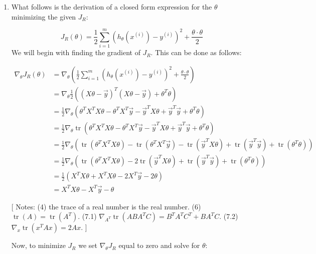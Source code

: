 \documentclass[12pt]{article}
\DeclareMathOperator{\Tr}{tr}
\begin{document}
\begin{enumerate}
   \item What follows is the derivation of a closed form expression for the  $\theta$ minimizing the given $J_R$:
   
   \[
   J_R(\theta) = \frac{1}{2} \sum_{i=1}^{m} \left( h_\theta (x^{(i)}) - y^{(i)} \right)^2 + \frac{\theta \cdot \theta}{2} 
   \]
   We will begin with finding the gradient of $J_R$. This can be done as follows:
   
   \begin{align}
   \nabla_\theta J_R(\theta) &= \nabla_\theta \left( \frac{1}{2} \sum_{i=1}^{m} \left( h_\theta (x^{(i)}) - y^{(i)} \right)^2 + \frac{\theta \cdot \theta}{2} \right)   \\
   &= \nabla_\theta \frac{1}{2} \left((X\theta - \vec{y})^T(X\theta - \vec{y}) + \theta^T \theta \right) \\
   &= \frac{1}{2} \nabla_\theta \left( \theta^TX^TX\theta - \theta^TX^T\vec{y} - \vec{y}^TX\theta + \vec{y}^T\vec{y} + \theta^T\theta \right) \\
   &= \frac{1}{2} \nabla_\theta \Tr \left( \theta^TX^TX\theta - \theta^TX^T\vec{y} - \vec{y}^TX\theta + \vec{y}^T\vec{y} + \theta^T\theta \right) \\
   &= \frac{1}{2} \nabla_\theta \left( \Tr(\theta^TX^TX\theta) - \Tr( \theta^TX^T\vec{y}) - \Tr(\vec{y}^TX\theta) + \Tr(\vec{y}^T\vec{y}) + \Tr(\theta^T\theta) \right) \\
   &= \frac{1}{2} \nabla_\theta \left( \Tr(\theta^TX^TX\theta) - 2\Tr(\vec{y}^TX\theta) + \Tr(\vec{y}^T\vec{y}) + \Tr(\theta^T\theta) \right) \\
   &= \frac{1}{2} \left( X^TX\theta + X^TX\theta - 2X^T\vec{y} - 2\theta \right)  \\
   &= X^TX\theta - X^T\vec{y} - \theta
   \end{align}
   
  \small [ Notes: (4) the trace of a real number is the real number. (6) $\Tr(A) = \Tr(A^T)$. (7.1) $\nabla_{A^T} \Tr (ABA^TC) = B^TA^TC^T + BA^TC$. (7.2) $\nabla_x\Tr(x^TAx) = 2Ax.$
  ]
  
  Now, to minimize $J_R$ we set $\nabla_\theta J_R$ equal to zero and solve for $\theta$:
  
  
\end{enumerate}
\end{document}
